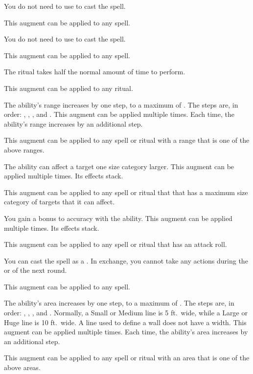              You do not need to use  to cast the spell.
            \par This augment can be applied to any spell.

             You do not need to use  to cast the spell.
            \par This augment can be applied to any spell.

             The ritual takes half the normal amount of time to perform.
            \par This augment can be applied to any ritual.

             The ability's range increases by one step, to a maximum of \rngext.
            The steps are, in order: \rngclose, \rngmed, \rnglong, and \rngext.
            This augment can be applied multiple times.
            Each time, the ability's range increases by an additional step.
            \par This augment can be applied to any spell or ritual with a range that is one of the above ranges.

             The ability can affect a target one size category larger.
            This augment can be applied multiple times.
            Its effects stack.
            \par This augment can be applied to any spell or ritual that that has a maximum size category of targets that it can affect.

             You gain a  bonus to accuracy with the ability.
            This augment can be applied multiple times.
            Its effects stack.
            \par This augment can be applied to any spell or ritual that has an attack roll.

             You can cast the spell as a .
            In exchange, you cannot take any actions during the  or  of the next round.
            \par This augment can be applied to any spell.

             The ability's area increases by one step, to a maximum of \areahuge.
            The steps are, in order: \areasmall, \areamed, \arealarge, and \areahuge.
            Normally, a Small or Medium line is 5 ft.\ wide, while a Large or Huge line is 10 ft.\ wide.
            A line used to define a wall does not have a width.
            This augment can be applied multiple times.
            Each time, the ability's area increases by an additional step.
            \par This augment can be applied to any spell or ritual with an area that is one of the above areas.

